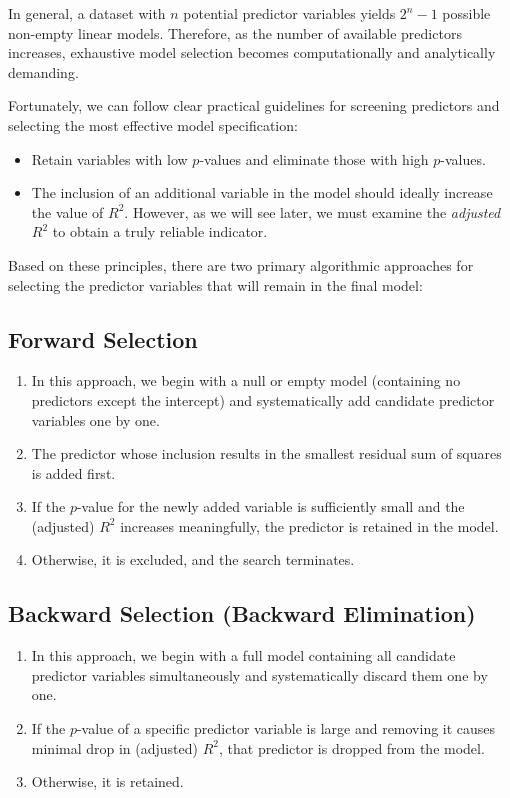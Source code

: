 \begin{observacion}
	In general, a dataset with $n$ potential predictor variables yields $2^n - 1$ possible non-empty linear models. Therefore, as the number of available predictors increases, exhaustive model selection becomes computationally and analytically demanding.
\end{observacion}

Fortunately, we can follow clear practical guidelines for screening predictors and selecting the most effective model specification:
\begin{itemize}
	\item Retain variables with low $p$-values and eliminate those with high $p$-values.
	\item The inclusion of an additional variable in the model should ideally increase the value of $R^2$. However, as we will see later, we must examine the \emph{adjusted} $R^2$ to obtain a truly reliable indicator.
\end{itemize}

Based on these principles, there are two primary algorithmic approaches for selecting the predictor variables that will remain in the final model:

\subsection{Forward Selection}
\begin{enumerate}
	\item In this approach, we begin with a null or empty model (containing no predictors except the intercept) and systematically add candidate predictor variables one by one.
	\item The predictor whose inclusion results in the smallest residual sum of squares is added first.
	\item If the $p$-value for the newly added variable is sufficiently small and the (adjusted) $R^2$ increases meaningfully, the predictor is retained in the model.
	\item Otherwise, it is excluded, and the search terminates.
\end{enumerate}

\subsection{Backward Selection (Backward Elimination)}
\begin{enumerate}
	\item In this approach, we begin with a full model containing all candidate predictor variables simultaneously and systematically discard them one by one.
	\item If the $p$-value of a specific predictor variable is large and removing it causes minimal drop in (adjusted) $R^2$, that predictor is dropped from the model.
	\item Otherwise, it is retained.
\end{enumerate}

